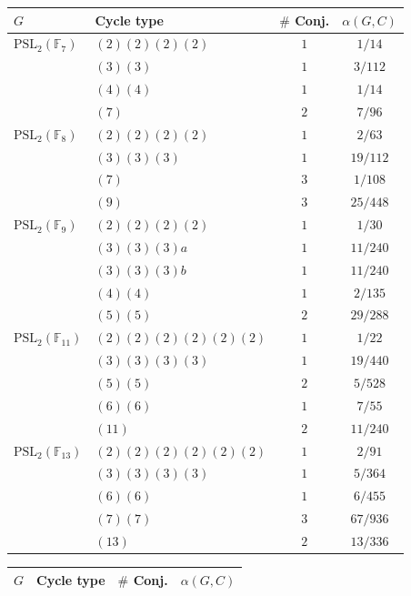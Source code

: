 \documentclass[12pt]{amsart}
\theoremstyle{definition} \newtheorem{definition}[theorem]{Definition}
\theoremstyle{example} \newtheorem{example}[theorem]{Example}
\theoremstyle{remark} \newtheorem{remark}{Remark}[theorem]
\numberwithin{equation}{section}
\numberwithin{theorem}{section}
\begin{document}
	{\tiny
	\begin{table}[h]
		\begin{minipage}[t]{0.45\textwidth}
		\begin{tabular}{|l|l|c|c|} \hline
			$G$ & Cycle type & $\#$ Conj. & $\alpha(G,C)$ \\ \hline
			$\mathrm{PSL}_2(\mathbb{F}_7)$ 
				& $(2)(2)(2)(2)$ & $1$ & $1/14$ \\
				& $(3)(3)$ & $1$ & $3/112$ \\
				& $(4)(4)$ & $1$ & $1/14$ \\
				& $(7)$ & $2$ & $7/96$ \\ \hline
			$\mathrm{PSL}_2(\mathbb{F}_8)$
				& $(2)(2)(2)(2)$ & $1$ & $2/63$ \\
				& $(3)(3)(3)$ & $1$ & $19/112$ \\
				& $(7)$ & $3$ & $1/108$ \\
				& $(9)$ & $3$ & $25/448$ \\ \hline
			$\mathrm{PSL}_2(\mathbb{F}_9)$
				& $(2)(2)(2)(2)$ & $1$ & $1/30$ \\
				& $(3)(3)(3)a$ & $1$ & $11/240$ \\
				& $(3)(3)(3)b$ & $1$ & $11/240$ \\
				& $(4)(4)$ & $1$ & $2/135$ \\
				& $(5)(5)$ & $2$ & $29/288$ \\ \hline
			$\mathrm{PSL}_2(\mathbb{F}_{11})$
				& $(2)(2)(2)(2)(2)(2)$ & $1$ & $1/22$ \\
				& $(3)(3)(3)(3)$ & $1$ & $19/440$ \\
				& $(5)(5)$ & $2$ & $5/528$ \\
				& $(6)(6)$ & $1$ & $7/55$ \\
				& $(11)$ & $2$ & $11/240$ \\ \hline
			$\mathrm{PSL}_2(\mathbb{F}_{13})$
				& $(2)(2)(2)(2)(2)(2)$ & $1$ & $2/91$ \\
				& $(3)(3)(3)(3)$ & $1$ & $5/364$ \\
				& $(6)(6)$ & $1$ & $6/455$ \\
				& $(7)(7)$ & $3$ & $67/936$ \\
				& $(13)$ & $2$ & $13/336$ \\ \hline
		\end{tabular}
		\end{minipage}
		\begin{minipage}[t]{0.45\textwidth}
		\begin{tabular}{|l|l|c|c|} \hline
			$G$ & Cycle type & $\#$ Conj. & $\alpha(G,C)$ \\ \hline

\end{tabular}
\end{minipage}
\end{table}}
\end{document}
